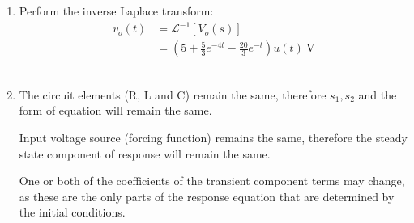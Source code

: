 \begin{enumerate}
	\item{
		Perform the inverse Laplace transform:
		\begin{align*}
			v_o(t) &= \mathcal{L}^{-1}\left[ V_o(s) \right] \\
			&= \left(5 + \frac{5}{3}e^{-4t} - \frac{20}{3}e^{-t} \right) u(t) \ \mathrm{V}
		\end{align*}
		\\
	}

	\item{
		The circuit elements (R, L and C) remain the same, therefore $s_1, s_2$ and the form of equation will remain the same. 
		\par
		Input voltage source (forcing function) remains the same, therefore the steady state component of response will remain the same.
		\par
		One or both of the coefficients of the transient component terms may change, as these are the only parts of the response equation that are determined by the initial conditions.
		\\
	}

\end{enumerate}
